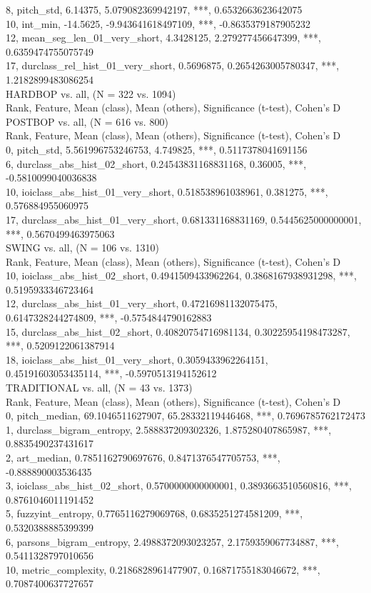 8, pitch_std, 6.14375, 5.079082369942197, ***, 0.6532663623642075\\
10, int_min, -14.5625, -9.943641618497109, ***, -0.8635379187905232\\
12, mean_seg_len_01_very_short, 4.3428125, 2.279277456647399, ***, 0.6359474755075749\\
17, durclass_rel_hist_01_very_short, 0.5696875, 0.2654263005780347, ***, 1.2182899483086254\\
HARDBOP vs. all, (N = 322 vs. 1094)\\
Rank, Feature, Mean (class), Mean (others), Significance (t-test), Cohen's D\\
POSTBOP vs. all, (N = 616 vs. 800)\\
Rank, Feature, Mean (class), Mean (others), Significance (t-test), Cohen's D\\
0, pitch_std, 5.561996753246753, 4.749825, ***, 0.5117378041691156\\
6, durclass_abs_hist_02_short, 0.24543831168831168, 0.36005, ***, -0.5810099040036838\\
10, ioiclass_abs_hist_01_very_short, 0.518538961038961, 0.381275, ***, 0.576884955060975\\
17, durclass_abs_hist_01_very_short, 0.681331168831169, 0.5445625000000001, ***, 0.5670499463975063\\
SWING vs. all, (N = 106 vs. 1310)\\
Rank, Feature, Mean (class), Mean (others), Significance (t-test), Cohen's D\\
10, ioiclass_abs_hist_02_short, 0.4941509433962264, 0.3868167938931298, ***, 0.5195933346723464\\
12, durclass_abs_hist_01_very_short, 0.47216981132075475, 0.6147328244274809, ***, -0.5754844790162883\\
15, durclass_abs_hist_02_short, 0.40820754716981134, 0.30225954198473287, ***, 0.5209122061387914\\
18, ioiclass_abs_hist_01_very_short, 0.3059433962264151, 0.45191603053435114, ***, -0.5970513194152612\\
TRADITIONAL vs. all, (N = 43 vs. 1373)\\
Rank, Feature, Mean (class), Mean (others), Significance (t-test), Cohen's D\\
0, pitch_median, 69.1046511627907, 65.28332119446468, ***, 0.7696785762172473\\
1, durclass_bigram_entropy, 2.588837209302326, 1.875280407865987, ***, 0.8835490237431617\\
2, art_median, 0.7851162790697676, 0.8471376547705753, ***, -0.888890003536435\\
3, ioiclass_abs_hist_02_short, 0.5700000000000001, 0.3893663510560816, ***, 0.8761046011191452\\
5, fuzzyint_entropy, 0.7765116279069768, 0.6835251274581209, ***, 0.5320388885399399\\
6, parsons_bigram_entropy, 2.4988372093023257, 2.1759359067734887, ***, 0.5411328797010656\\
10, metric_complexity, 0.2186828961477907, 0.16871755183046672, ***, 0.7087400637727657\\
